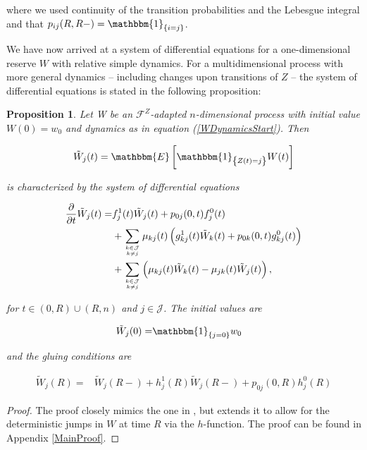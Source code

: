 \documentclass{article}
\newcommand{\1}[1]{\mathbbm{1}_{\left\lbrace #1 \right\rbrace}}
\newcommand{\expec}[1][def]{\mathbbm{E} \left[ #1 \right]}
\theoremstyle{break}
\newtheorem{proposition}[definition]{Proposition}%
\theoremstyle{remark}
\numberwithin{equation}{section}
\begin{document}
where we used continuity of the transition probabilities and the Lebesgue integral and that $p_{ij}(R,R-) = \1{i=j}$.

We have now arrived at a system of differential equations for a one-dimensional reserve $W$ with relative simple dynamics. For a multidimensional process with more general dynamics -- including changes upon transitions of $Z$ -- the system of differential equations is stated in the following proposition:

\begin{proposition} \label{MainResult}
	Let W be an $\mathcal{F}^{Z}$-adapted $n$-dimensional process with initial value $W(0)=w_0$ and dynamics as in equation (\ref{WDynamicsStart}). Then
	
	\begin{align*}
	\tilde{W}_j(t) = \expec[\1{Z(t)=j} W(t)]
	\end{align*}
	
	is characterized by the system of differential equations
	
	\begin{align*}
	\frac{\partial}{\partial t} \tilde{W}_j(t) =& f_j^1(t) \tilde{W}_j(t) + p_{0j}(0,t) f_j^0(t) \\
	&+ \sum_{k \in \mathcal{J} \atop k \neq j} \mu_{kj}(t) \left( g_{kj}^1(t) \tilde{W}_k(t) + p_{0k}(0,t) g_{kj}^0(t) \right) \\
	&+ \sum_{k \in \mathcal{J} \atop k \neq j} \left( \mu_{kj}(t) \tilde{W}_k(t) - \mu_{jk}(t) \tilde{W}_j(t) \right),
	\end{align*}
	
	for $t \in (0,R)\cup(R,n)$ and $j \in \mathcal{J}$. The initial values are
	
	\begin{align*}
	\tilde{W}_j(0) =& \1{j=0} w_0
	\end{align*}
	
	and the gluing conditions are
	
	\begin{align*}
	\tilde{W}_j(R) =& \tilde{W}_j(R-) + h_j^1(R) \tilde{W}_j(R-) + p_{0j}(0,R) h_j^0(R)
	\end{align*}
	
\end{proposition}
\begin{proof}
	The proof closely mimics the one in \cite{Lollike}, but extends it to allow for the deterministic jumps in $W$ at time $R$ via the $h$-function. The proof can be found in Appendix \ref{MainProof}.
\end{proof}
\end{document}
